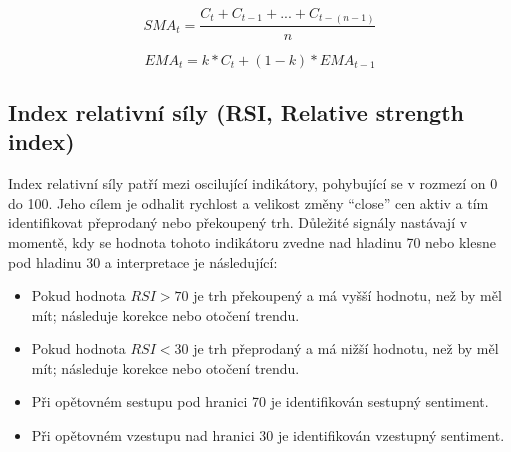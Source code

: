 \begin{equation}
    SMA_t = \frac{C_t + C_{t - 1} + ... + C_{t - (n - 1)}}{n}
    \label{eq:sma}
\end{equation}

\begin{equation}
    EMA_t = k * C_t + (1 - k) * EMA_{t - 1}
    \label{eq:ema}
\end{equation}

\subsection{Index relativní síly (RSI, Relative strength index)}
Index relativní síly patří mezi oscilující indikátory, pohybující se v rozmezí on 0 do 100. Jeho cílem je odhalit rychlost a velikost změny \enquote{close} cen aktiv a tím identifikovat
přeprodaný nebo překoupený trh. Důležité signály nastávají v momentě, kdy se hodnota tohoto indikátoru zvedne nad hladinu 70 nebo klesne pod hladinu 30 a interpretace je následující:
\begin{itemize}
    \item Pokud hodnota $RSI > 70$ je trh překoupený a má vyšší hodnotu, než by měl mít; následuje korekce nebo otočení trendu.
    \item Pokud hodnota $RSI < 30$ je trh přeprodaný a má nižší hodnotu, než by měl mít; následuje korekce nebo otočení trendu.
    \item Při opětovném sestupu pod hranici 70 je identifikován sestupný sentiment.
    \item Při opětovném vzestupu nad hranici 30 je identifikován vzestupný sentiment.
\end{itemize}

